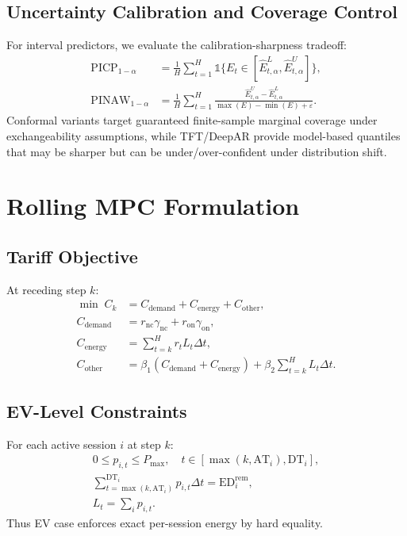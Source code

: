 \documentclass[journal]{IEEEtran}
\newcommand{\AT}{\mathrm{AT}}
\newcommand{\DT}{\mathrm{DT}}
\newcommand{\ED}{\mathrm{ED}}
\begin{document}
\subsection{Uncertainty Calibration and Coverage Control}
For interval predictors, we evaluate the calibration-sharpness tradeoff:
\begin{align}
\mathrm{PICP}_{1-\alpha} &= \frac{1}{H}\sum_{t=1}^{H}\mathbb{1}\{E_t\in[\hat{E}^{L}_{t,\alpha},\hat{E}^{U}_{t,\alpha}]\},\\
\mathrm{PINAW}_{1-\alpha} &= \frac{1}{H}\sum_{t=1}^{H}\frac{\hat{E}^{U}_{t,\alpha}-\hat{E}^{L}_{t,\alpha}}{\max(E)-\min(E)+\varepsilon}.
\end{align}
Conformal variants target guaranteed finite-sample marginal coverage under exchangeability assumptions, while TFT/DeepAR provide model-based quantiles that may be sharper but can be under/over-confident under distribution shift.

\section{Rolling MPC Formulation}

\subsection{Tariff Objective}
At receding step $k$:
\begin{align}
\min \; C_k &= C_{\mathrm{demand}}+C_{\mathrm{energy}}+C_{\mathrm{other}},\\
C_{\mathrm{demand}} &= r_{\mathrm{nc}}\gamma_{\mathrm{nc}}+r_{\mathrm{on}}\gamma_{\mathrm{on}},\\
C_{\mathrm{energy}} &= \sum_{t=k}^{H} r_tL_t\Delta t,\\
C_{\mathrm{other}} &= \beta_1(C_{\mathrm{demand}}+C_{\mathrm{energy}})+\beta_2\sum_{t=k}^{H}L_t\Delta t.
\end{align}

\subsection{EV-Level Constraints}
For each active session $i$ at step $k$:
\begin{align}
0\le p_{i,t}\le P_{\max}, \quad t\in[\max(k,\AT_i),\DT_i],\\
\sum_{t=\max(k,\AT_i)}^{\DT_i} p_{i,t}\Delta t = \ED_i^{\mathrm{rem}},\\
L_t=\sum_i p_{i,t}.
\end{align}
Thus EV case enforces exact per-session energy by hard equality.
\end{document}
